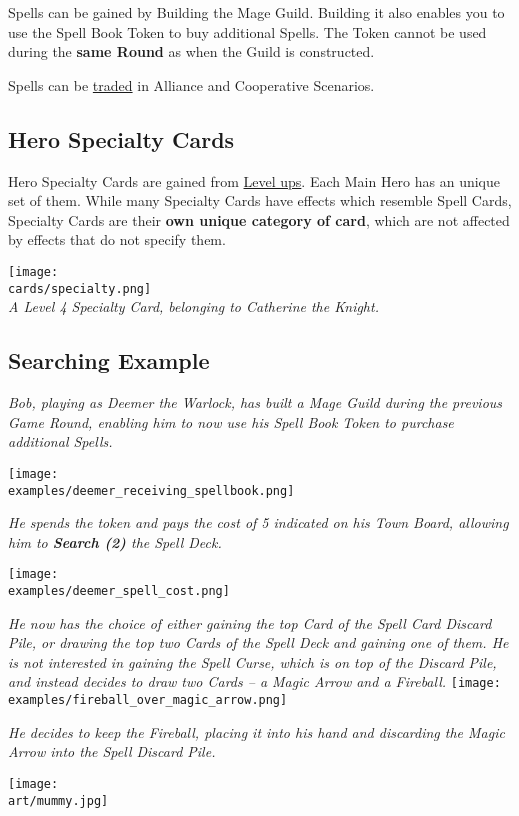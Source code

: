 \begin{multicols*}{2}
\par
Spells can be gained by Building the Mage Guild.
Building it also enables you to use the Spell Book Token to buy additional Spells.
The Token cannot be used during the \textbf{same Round} as when the Guild is constructed.\par
Spells can be \hyperlink{Trading}{traded} in Alliance and Cooperative Scenarios.

\subsection*{\hypertarget{Specialty}{Hero Specialty Cards}}

Hero Specialty Cards are gained from \hyperlink{Level}{Level ups}.
Each Main Hero has an unique set of them.
While many Specialty Cards have effects which resemble Spell Cards, Specialty Cards are their \textbf{own unique category of card}, which are not affected by effects that do not specify them.

\begin{center}
  \texttt{[image: \\cards/specialty.png]}\\
  \medskip
  \footnotesize\textit{A Level 4 Specialty Card, belonging to Catherine the Knight.}
\end{center}

\subsection*{Searching Example}

\textit{Bob, playing as Deemer the Warlock, has built a Mage Guild during the previous Game Round, enabling him to now use his Spell Book Token to purchase additional Spells.}\par
\texttt{[image: \\examples/deemer\_receiving\_spellbook.png]}\par
\textit{He spends the token and pays the cost of 5  indicated on his Town Board, allowing him to \textbf{Search (2)} the Spell Deck.}\par
\texttt{[image: \\examples/deemer\_spell\_cost.png]}\par
\textit{He now has the choice of either gaining the top Card of the Spell Card Discard Pile, or drawing the top two Cards of the Spell Deck and gaining one of them.
He is not interested in gaining the Spell Curse, which is on top of the Discard Pile, and instead decides to draw two Cards – a Magic Arrow and a Fireball.}
\texttt{[image: \\examples/fireball\_over\_magic\_arrow.png]}\par
\textit{He decides to keep the Fireball, placing it into his hand and discarding the Magic Arrow into the Spell Discard Pile.}

\texttt{[image: \\art/mummy.jpg]}
\end{multicols*}
